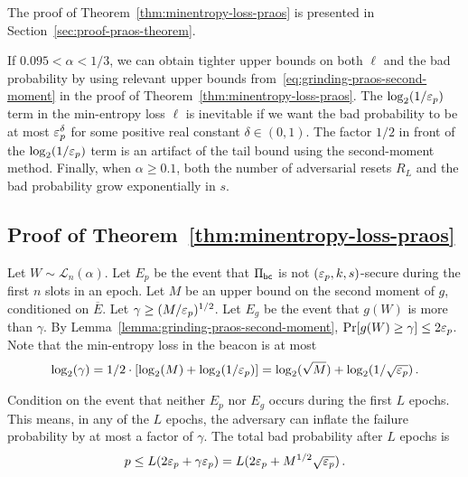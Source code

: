The proof of Theorem~\ref{thm:minentropy-loss-praos} 
is presented in Section~\ref{sec:proof-praos-theorem}. 

\begin{remark*}
  If $0.095 < \alpha < 1/3$, we can obtain tighter upper bounds on both $\ell$ and the bad probability 
  by using relevant upper bounds from~\eqref{eq:grinding-praos-second-moment} 
  in the proof of Theorem~\ref{thm:minentropy-loss-praos}. 
  The $\log_2(1/\mathsf{\varepsilon}_p)$ term in the min-entropy loss $\ell$ 
  is inevitable if we want 
  the bad probability to be at most $\mathsf{\varepsilon}_p^\delta$ 
  for some positive real constant $\delta \in (0, 1)$. 
  The factor $1/2$ in front of the $\log_2(1/\mathsf{\varepsilon}_p)$ term 
  is an artifact of the tail bound using the second-moment method.
  Finally, when $\alpha \geq 0.1$, 
  both the number of adversarial resets $R_L$
  and the bad probability 
  grow exponentially in $s$.
\end{remark*}


\subsection{Proof of Theorem~\ref{thm:minentropy-loss-praos}}

Let $W \sim \mathcal{L}_n(\alpha)$. 
Let $E_p$ be the event that 
$\Pi_\mathsf{bc}$ is not $(\mathsf{\varepsilon}_p, k, s)$-secure during 
the first $n$ slots in an epoch. 
Let $M$ be an upper bound on the second moment of $g$, 
conditioned on $\overline{E}$. 
Let $\gamma \geq (M/\mathsf{\varepsilon}_p)^{1/2}$. 
Let $E_g$ be the event that $g(W)$ is more than $\gamma$.
By Lemma~\ref{lemma:grinding-praos-second-moment}, 
$\Pr[g(W) \geq \gamma] \leq 2 \mathsf{\varepsilon}_p$. 
Note that the min-entropy loss in the beacon is at most 
\begin{equation}\label{eq:log-gamma}
 \log_2(\gamma) 
 = 1/2 \cdot [\log_2(M) + \log_2(1/\mathsf{\varepsilon}_p)]
 = \log_2(\sqrt{M}) + \log_2(1/\sqrt{\mathsf{\varepsilon}_p})
 \,. 
\end{equation}


Condition on the event that neither $E_p$ nor $E_g$ 
occurs during the first $L$ epochs. 
This means, in any of the $L$ epochs, 
the adversary can inflate the failure probability 
by at most a factor of $\gamma$.
The total bad probability after $L$ epochs is
$$
  p
  \leq L (2 \mathsf{\varepsilon}_p + \gamma \mathsf{\varepsilon}_p)
  = L (2 \mathsf{\varepsilon}_p + M^{1/2} \sqrt{\mathsf{\varepsilon}_p})
  \,.
$$

